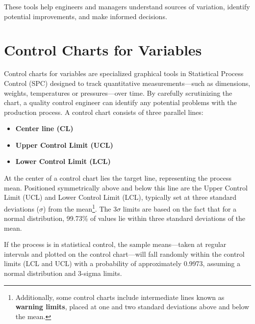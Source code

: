 \documentclass[twoside]{book}
\begin{document}
These tools help engineers and managers understand sources of variation, identify potential improvements, and make informed decisions.


\section{Control Charts for Variables}

Control charts for variables are specialized graphical tools in Statistical Process Control (SPC) designed to track quantitative measurements—such as dimensions, weights, temperatures or pressures—over time. By carefully scrutinizing the chart, a
quality control engineer can identify any potential problems with the production process. A control chart consists of three parallel lines:

\begin{itemize}
    \item \textbf{Center line (CL)}
    \item \textbf{Upper Control Limit (UCL)}
    \item \textbf{Lower Control Limit (LCL)}
\end{itemize}
At the center of a control chart lies the target line, representing the process mean. Positioned symmetrically above and below this line are the Upper Control Limit (UCL) and Lower Control Limit (LCL), typically set at three standard deviations ($\sigma$) from the mean\footnote{Additionally, some control charts include intermediate lines known as \textbf{warning limits}, placed at one and two standard deviations above and below the mean.}. The $3\sigma$ limits are based on the fact that for a normal distribution, 99.73\% of values lie within three standard deviations of the mean.

If the process is in statistical control, the sample means—taken at regular intervals and plotted on the control chart—will fall randomly within the control limits (LCL and UCL) with a probability of approximately 0.9973, assuming a normal distribution and 3-sigma limits.
\end{document}
